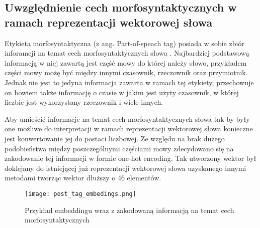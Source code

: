 

\subsection{Uwzględnienie cech morfosyntaktycznych w ramach reprezentacji wektorowej słowa}



Etykieta morfosyntaktyczna (z ang. Part-of-speach tag) posiada w sobie zbiór inforamcji na temat cech morfosyntaktycznych słowa \cite{postags_def}. Najbardziej podstawową informacją w niej zawartą jest część mowy do której należy słowo, przykładem części mowy możę być między innymi czasownik, rzeczownik oraz przymiotnik. Jednak nie jest to jedyna informacja zawarta w ramach tej etykiety, przechowuje on bowiem także informację o czasie w jakim jest użyty czasownik, w której liczbie jest wykorzystany rzeczownik i wiele innych.




Aby umieścić informacje na temat cech morfosyntaktycznych słowa tak by były one możliwe do interpretacji w ramach reprezentacji wektorowej słowa konieczne jest konwertowanie jej do postaci liczbowej. Ze względu na brak dużego podobieństwa między poszczególnymi częściami mowy zdecydowano się na zakodowanie tej informacji w formie one-hot encoding. Tak utworzony wektor był doklejany do istniejącej już reprezentacji wektorowej słowa uzyskanego innymi metodami tworząc wektor dłuższy o 46 elementów.




\begin{figure}[!h]
    \label{fig:post_tag}
    \centering \texttt{[image: post\_tag\_embedings.png]}
    \caption{Przykład embeddingu wraz z zakodowaną informacją na temat cech  morfosyntaktycznych}
\end{figure}